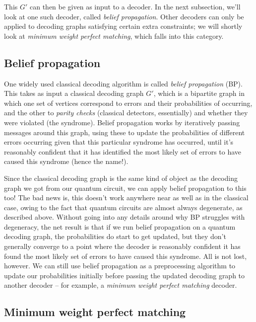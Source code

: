 This $G'$ can then be given as input to a decoder.
In the next subsection, we'll look at one such decoder, called \textit{belief propagation}.
Other decoders can only be applied to decoding graphs satisfying certain extra constraints; we will shortly look at \textit{minimum weight perfect matching}, which falls into this category.

\subsection{Belief propagation}

One widely used classical decoding algorithm is called \textit{belief propagation} (BP).
This takes as input a classical decoding graph $G'$, which is a bipartite graph in which one set of vertices correspond to errors and their probabilities of occurring, and the other to \textit{parity checks} (classical detectors, essentially) and whether they were violated (the syndrome).
Belief propagation works by iteratively passing messages around this graph, using these to update the probabilities of different errors occurring given that this particular syndrome has occurred, until it's reasonably confident that it has identified the most likely set of errors to have caused this syndrome (hence the name!).

Since the classical decoding graph is the same kind of object as the decoding graph we got from our quantum circuit, we can apply belief propagation to this too!
The bad news is, this doesn't work anywhere near as well as in the classical case, owing to the fact that quantum circuits are almost always degenerate, as described above.
Without going into any details around why BP struggles with degeneracy, the net result is that if we run belief propagation on a quantum decoding graph, the probabilities do start to get updated, but they don't generally converge to a point where the decoder is reasonably confident it has found the most likely set of errors to have caused this syndrome.
All is not lost, however.
We can still use belief propagation as a preprocessing algorithm to update our probabilities initially before passing the updated decoding graph to another decoder -- for example, a \textit{minimum weight perfect matching} decoder.

\subsection{Minimum weight perfect matching}

